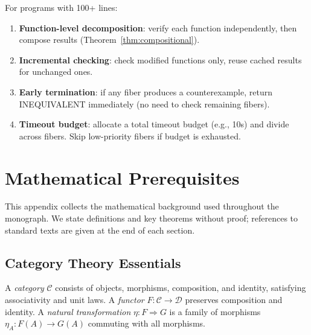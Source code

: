 \documentclass[11pt,a4paper]{report}
\theoremstyle{definition}
\theoremstyle{plain}
\begin{document}
For programs with 100+ lines:
\begin{enumerate}
  \item \textbf{Function-level decomposition}: verify each function
    independently, then compose results (Theorem~\ref{thm:compositional}).
  \item \textbf{Incremental checking}: check modified functions only,
    reuse cached results for unchanged ones.
  \item \textbf{Early termination}: if any fiber produces a
    counterexample, return INEQUIVALENT immediately (no need to
    check remaining fibers).
  \item \textbf{Timeout budget}: allocate a total timeout budget
    (e.g., 10s) and divide across fibers.  Skip low-priority fibers
    if budget is exhausted.
\end{enumerate}



\appendix

\chapter{Mathematical Prerequisites}
\label{app:prereqs}

This appendix collects the mathematical background used throughout
the monograph.  We state definitions and key theorems without proof;
references to standard texts are given at the end of each section.

\section{Category Theory Essentials}

A \emph{category} $\mathcal{C}$ consists of objects, morphisms,
composition, and identity, satisfying associativity and unit laws.
A \emph{functor} $F : \mathcal{C} \to \mathcal{D}$ preserves
composition and identity.  A \emph{natural transformation}
$\eta : F \Rightarrow G$ is a family of morphisms $\eta_A : F(A) \to
G(A)$ commuting with all morphisms.
\end{document}
